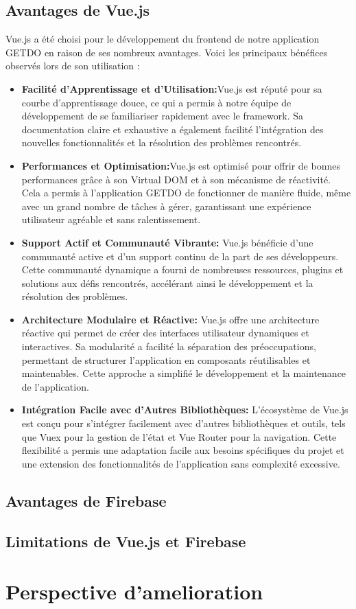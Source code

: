 \documentclass[a4paper,12pt]{report}
\begin{document}
    \subsection{Avantages de Vue.js}
    Vue.js a été choisi pour le développement du frontend de notre application GETDO en raison de ses nombreux avantages. Voici les principaux bénéfices observés lors de son utilisation :
    \begin{itemize}
      \item\textbf{Facilité d'Apprentissage et d'Utilisation:}Vue.js est réputé pour sa courbe d'apprentissage douce, ce qui a permis à notre équipe de développement de se familiariser rapidement avec le framework. Sa documentation claire et exhaustive a également facilité l'intégration des nouvelles fonctionnalités et la résolution des problèmes rencontrés.
      
      \item\textbf{Performances et Optimisation:}Vue.js est optimisé pour offrir de bonnes performances grâce à son Virtual DOM et à son mécanisme de réactivité. Cela a permis à l'application GETDO de fonctionner de manière fluide, même avec un grand nombre de tâches à gérer, garantissant une expérience utilisateur agréable et sans ralentissement.
      
      \item\textbf{Support Actif et Communauté Vibrante:}
      Vue.js bénéficie d'une communauté active et d'un support continu de la part de ses développeurs. Cette communauté dynamique a fourni de nombreuses ressources, plugins et solutions aux défis rencontrés, accélérant ainsi le développement et la résolution des problèmes.
      
      \item\textbf{Architecture Modulaire et Réactive:}
      Vue.js offre une architecture réactive qui permet de créer des interfaces utilisateur dynamiques et interactives. Sa modularité a facilité la séparation des préoccupations, permettant de structurer l'application en composants réutilisables et maintenables. Cette approche a simplifié le développement et la maintenance de l'application.
      
      \item\textbf{Intégration Facile avec d'Autres Bibliothèques:}
      L'écosystème de Vue.js est conçu pour s'intégrer facilement avec d'autres bibliothèques et outils, tels que Vuex pour la gestion de l'état et Vue Router pour la navigation. Cette flexibilité a permis une adaptation facile aux besoins spécifiques du projet et une extension des fonctionnalités de l'application sans complexité excessive.
    \end{itemize}
    
    \subsection{Avantages de Firebase}
    \subsection{Limitations de Vue.js et Firebase}
  \section{Perspective d'amelioration}
  
\end{document}

